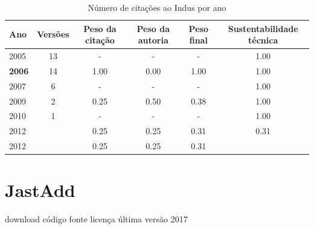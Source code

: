 \begin{table}[H]
\caption{Número de citações ao Indus por ano}
\centering
\begin{tabular}{| l | c | c | c | c | c |}
  \hline
  Ano & Versões & Peso da citação & Peso da autoria & Peso final & Sustentabilidade técnica \\
  \hline
        2005 & 13 & - & - & -
        &
          {\color{blue} 1.00}
        \\
\hline
            {\bf 2006}
          &
          14
          &
          1.00
          &
          0.00
          &
          1.00
          &
            {\color{blue} 1.00}
          \\
\hline
        2007 & 6 & - & - & -
        &
          {\color{blue} 1.00}
        \\
\hline
            2009
          &
          2
          &
          0.25
          &
          0.50
          &
          0.38
          &
            {\color{blue} 1.00}
          \\
\hline
        2010 & 1 & - & - & -
        &
          {\color{blue} 1.00}
        \\
\hline
            2012
          &
          
          &
          0.25
          &
          0.25
          &
          0.31
          &
            {\color{red} 0.31}
          \\
            2012
          &
          
          &
          0.25
          &
          0.25
          &
          0.31
          &
          \\
\hline
\end{tabular}
\end{table}



\section{JastAdd}
\checkmark download
\checkmark código fonte
\checkmark licença
\checkmark última versão 2017


